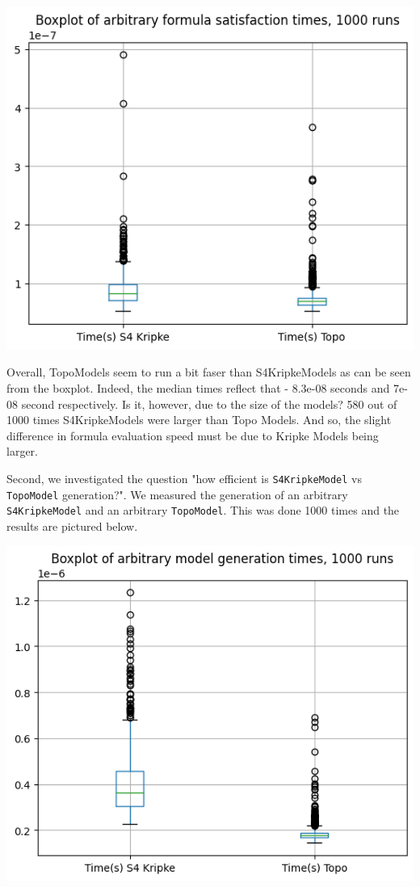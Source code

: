 \documentclass[12pt,a4paper]{article}
\begin{document}
\includegraphics*[width=\linewidth]{bench-formula-satisfaction.png}

Overall, TopoModels seem to run a bit faser than S4KripkeModels as can be seen from the boxplot. 
Indeed, the median times reflect that - 8.3e-08 seconds and 7e-08 second respectively. 
Is it, however, due to the size of the models? 580 out of 1000 times S4KripkeModels were larger 
than Topo Models. And so, the slight difference in formula evaluation speed must be due to 
Kripke Models being larger.

Second, we investigated the question "how efficient is \verb|S4KripkeModel| vs \verb|TopoModel| generation?". 
We measured the generation of an arbitrary \verb|S4KripkeModel| and an arbitrary \verb|TopoModel|.
This was done 1000 times and the results are pictured below.

\includegraphics*[width=\linewidth]{bench-model-generation.png}
\end{document}
